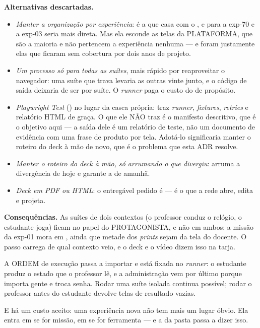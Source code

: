 \textbf{Alternativas descartadas.}
\begin{itemize}
  \item \emph{Manter a organização por experiência}: é a que casa com o
    , e para a exp-70 e a exp-03 seria mais direta. Mas
    ela esconde as telas da PLATAFORMA, que são a maioria e não pertencem a
    experiência nenhuma --- e foram justamente elas que ficaram sem cobertura
    por dois anos de projeto.
  \item \emph{Um processo só para todas as suítes}, mais rápido por reaproveitar
    o navegador: uma suíte que trava levaria as outras vinte junto, e o código
    de saída deixaria de ser por suíte. O \emph{runner} paga o custo do
     de propósito.
  \item \emph{Playwright Test} () no lugar da casca própria:
    traz \emph{runner}, \emph{fixtures}, \emph{retries} e relatório HTML de
    graça. O que ele NÃO traz é o manifesto descritivo, que é o objetivo aqui ---
    a saída dele é um relatório de teste, não um documento de evidência com uma
    frase de produto por tela. Adotá-lo significaria manter o roteiro do deck à
    mão de novo, que é o problema que esta ADR resolve.
  \item \emph{Manter o roteiro do deck à mão, só arrumando o que divergiu}:
    arruma a divergência de hoje e garante a de amanhã.
  \item \emph{Deck em PDF ou HTML}: o entregável pedido é  --- é o que
    a rede abre, edita e projeta.
\end{itemize}

\textbf{Consequências.} As suítes de dois contextos (o professor conduz o
relógio, o estudante joga) ficam no papel do PROTAGONISTA, e não em ambos: a
missão da exp-01 mora em , ainda que metade dos \emph{prints}
sejam da tela do docente. O passo carrega de qual contexto veio, e o deck e o
vídeo dizem isso na tarja.

A ORDEM de execução passa a importar e está fixada no \emph{runner}: o estudante
produz o estado que o professor lê, e a administração vem por último porque
importa gente e troca senha. Rodar uma suíte isolada continua possível; rodar o
professor antes do estudante devolve telas de resultado vazias.

E há um custo aceito: uma experiência nova não tem mais um lugar óbvio. Ela
entra em  se for missão, em  se for ferramenta
--- e a  da pasta  passa a dizer isso.

